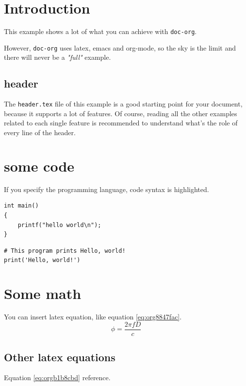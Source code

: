 


\maketitle
\thispagestyle{empty}
\newpage

\tableofcontents
\newpage

\pagestyle{plain}

\section{Introduction}
\label{sec:orgea50e24}
This example shows a lot of what you can achieve with \texttt{doc-org}.

However, \texttt{doc-org} uses latex, emacs and org-mode, so the sky is the limit and
there will never be a \emph{"full"} example.

\subsection{header}
\label{sec:orgfb5a28d}
The \texttt{header.tex} file of this example is a good starting point for your
document, because it supports a lot of features.
Of course, reading all the other examples related to each single feature is
recommended to understand what's the role of every line of the header.
\section{some code}
\label{sec:org6073d8c}
If you specify the programming language, code syntax is highlighted.
\begin{verbatim}
int main()
{
    printf("hello world\n");
}
\end{verbatim}

\begin{verbatim}
# This program prints Hello, world!
print('Hello, world!')
\end{verbatim}

\section{Some math}
\label{sec:org87b003b}
You can insert latex equation, like equation \ref{eq:org8847fac}.
\begin{equation}
\label{eq:org8847fac}
\phi = \frac{2\pi fD}{c}
\end{equation}
\subsection{Other latex equations}
\label{sec:orgf2c0f78}
Equation \ref{eq:orgb1b8cbd} reference.

